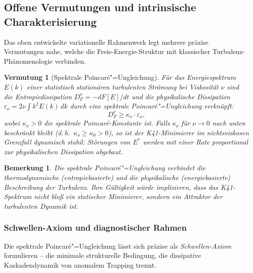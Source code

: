 \documentclass[12pt,a4paper]{article}
\theoremstyle{breakdef}
\theoremstyle{breakplain}
\newtheorem{conjecture}[definition]{Vermutung}
\theoremstyle{breakdef}
\newtheorem{remark}[definition]{Bemerkung}
\begin{document}
\subsection{Offene Vermutungen und intrinsische Charakterisierung}\label{sec:open-conjectures}

Das oben entwickelte variationelle Rahmenwerk legt mehrere präzise Vermutungen
nahe, welche die Freie-Energie-Struktur mit klassischer Turbulenz-Phänomenologie
verbinden.

\begin{conjecture}[Spektrale Poincaré"=Ungleichung]
\label{conj:spectral-poincare}
Für das Energiespektrum $E(k)$ einer statistisch stationären turbulenten Strömung bei Viskosität $\nu$ sind die Entropiedissipation $D_F^\nu = -dF[E]/dt$ und die physikalische Dissipation $\varepsilon_\nu = 2\nu \int k^2 E(k)\, dk$ durch eine spektrale Poincaré"=Ungleichung verknüpft:
\[
D_F^\nu \geq \kappa_\nu \cdot \varepsilon_\nu,
\]
wobei $\kappa_\nu > 0$ die spektrale Poincaré-Konstante ist. Falls $\kappa_\nu$ für $\nu \to 0$ nach unten beschränkt bleibt (d.\,h.\ $\kappa_\nu \geq \kappa_0 > 0$), so ist der K41-Minimierer im nichtsviskosen Grenzfall dynamisch stabil: Störungen von $E^*$ werden mit einer Rate proportional zur physikalischen Dissipation abgebaut.
\end{conjecture}

\begin{remark}
Die spektrale Poincaré"=Ungleichung verbindet die thermodynamische (entropiebasierte) und die physikalische (energiebasierte) Beschreibung der Turbulenz. Ihre Gültigkeit würde implizieren, dass das K41-Spektrum nicht bloß ein statischer Minimierer, sondern ein Attraktor der turbulenten Dynamik ist.
\end{remark}

\subsubsection*{Schwellen-Axiom und diagnostischer Rahmen}

Die spektrale Poincaré"=Ungleichung lässt sich präzise als \emph{Schwellen-Axiom} formulieren -- die minimale strukturelle Bedingung, die dissipative Kaskadendynamik von anomalem Trapping trennt.
\end{document}
